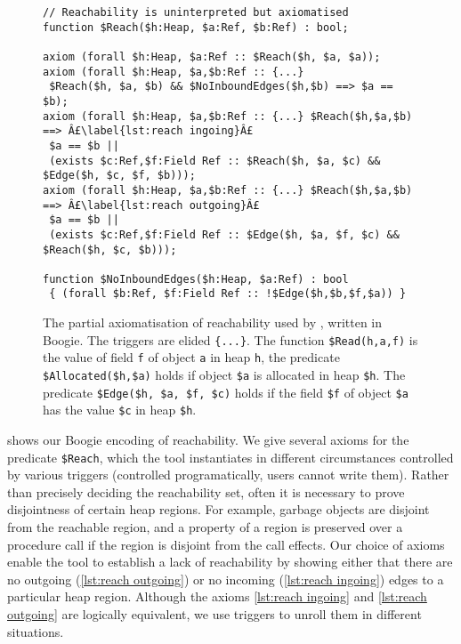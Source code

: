 \documentclass[runningheads,a4paper]{llncs}
\begin{document}
\begin{figure}[htbp]%
\centering%
\noindent\begin{lstlisting}[style=Boogie,firstnumber=auto,name=copyex]
// Reachability is uninterpreted but axiomatised
function $Reach($h:Heap, $a:Ref, $b:Ref) : bool;

axiom (forall $h:Heap, $a:Ref :: $Reach($h, $a, $a));
axiom (forall $h:Heap, $a,$b:Ref :: {...}
 $Reach($h, $a, $b) && $NoInboundEdges($h,$b) ==> $a == $b);
axiom (forall $h:Heap, $a,$b:Ref :: {...} $Reach($h,$a,$b) ==> Â£\label{lst:reach ingoing}Â£
 $a == $b ||
 (exists $c:Ref,$f:Field Ref :: $Reach($h, $a, $c) && $Edge($h, $c, $f, $b)));
axiom (forall $h:Heap, $a,$b:Ref :: {...} $Reach($h,$a,$b) ==> Â£\label{lst:reach outgoing}Â£
 $a == $b ||
 (exists $c:Ref,$f:Field Ref :: $Edge($h, $a, $f, $c) && $Reach($h, $c, $b)));

function $NoInboundEdges($h:Heap, $a:Ref) : bool
 { (forall $b:Ref, $f:Field Ref :: !$Edge($h,$b,$f,$a)) }
\end{lstlisting}
\caption{The partial axiomatisation of reachability used by \tool{}, written in Boogie. The triggers are elided \texttt{\{...\}}. The function \texttt{\$Read(h,a,f)} is the value of field \texttt{f} of object \texttt{a} in heap \texttt{h}, the predicate \texttt{\$Allocated(\$h,\$a)} holds if object \texttt{\$a} is allocated in heap \texttt{\$h}. The predicate \texttt{\$Edge(\$h, \$a, \$f, \$c)} holds if the field \texttt{\$f} of object \texttt{\$a} has the value \texttt{\$c} in heap \texttt{\$h}.\label{fig:reachability}}
\end{figure}
 shows our Boogie encoding of reachability. We give several axioms for the predicate \texttt{\$Reach}, which the tool instantiates in different circumstances controlled by various triggers (controlled programatically, users cannot write them). Rather than precisely deciding the reachability set, often it is necessary to prove disjointness of certain heap regions. For example, garbage objects are disjoint from the reachable region, and a property of a region is preserved over a procedure call if the region is disjoint from the call effects. Our choice of axioms enable the tool to establish a lack of reachability by showing either that there are no outgoing (\cref{lst:reach outgoing}) or no incoming (\cref{lst:reach ingoing}) edges to a particular heap region. Although the axioms \cref{lst:reach ingoing} and \cref{lst:reach outgoing} are logically equivalent, we use triggers to unroll them in different situations.
\end{document}
